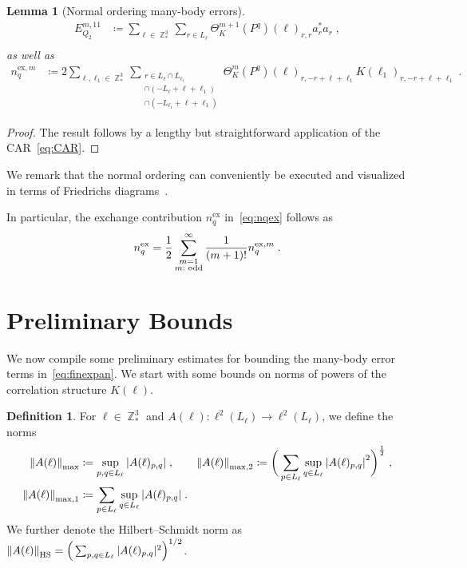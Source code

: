 \documentclass[12pt,a4paper]{article}
\numberwithin{equation}{section}
\newcommand{\1}{\mathbb{I}}
\newcommand{\ex}{\mathrm{ex}}
\newcommand{\HS}{\mathrm{HS}}
\DeclareMathOperator{\Z}{\mathbb{Z}}
\newcommand{\half}{\frac{1}{2}}
\theoremstyle{plain}
\newtheorem{lemma}[theorem]{Lemma}
\theoremstyle{definition}
\newtheorem{definition}[theorem]{Definition}
\theoremstyle{remark}
\theoremstyle{plain}
\theoremstyle{definition}
\theoremstyle{remark}
\begin{document}
\begin{lemma}[Normal ordering many-body errors]
\begin{align}
	E_{Q_2}^{m,11}
	&\coloneq \sum\limits_{\ell \in \Z^3_*} \sum\limits_{r\in L_{\ell}}\Theta^{m+1}_{K}(P^q)(\ell)_{r,r} a^*_{r}a_{r} \;, \label{eq:expandedEQ2}\\
\end{align}
as well as
\begin{align}
	n_q^{\ex,m}
	&\coloneq 2 \sum\limits_{\ell,\ell_1 \in \Z^3_*}\sum\limits_{\substack{r\in L_{\ell} \cap L_{\ell_1}\\ \cap (-L_{\ell}+\ell+\ell_1) \\ \cap (-L_{\ell_1}+\ell+\ell_1 )}} \!\!\!\Theta^m_{K}(P^q)(\ell)_{r,-r+\ell+\ell_1}K(\ell_1)_{r,-r+\ell+\ell_1} \;. \label{eq:nqexm}
\end{align}
\end{lemma}
\begin{proof}
The result follows by a lengthy but straightforward application of the CAR~\eqref{eq:CAR}.
\end{proof}

We remark that the normal ordering can conveniently be executed and visualized in terms of Friedrichs diagrams~\cite{BL23}.

In particular, the exchange contribution $ n_q^{\ex} $ in~\eqref{eq:nqex} follows as
\begin{equation*}
	n_q^{\ex}
	= \half \sum_{\substack{m=1\\m:\textnormal{ odd}}}^\infty \frac{1}{(m+1)!} n_q^{\ex,m} \;.
\end{equation*}






\section{Preliminary Bounds}
\label{sec:prelim_bounds}

We now compile some preliminary estimates for bounding the many-body error terms in~\eqref{eq:finexpan}. We start with some bounds on norms of powers of the correlation structure $ K(\ell) $.

\begin{definition}
For $ \ell \in \Z^3_*$ and $A(\ell) : \ell^2(L_\ell) \to \ell^2(L_\ell)$, we define the norms
\begin{equation}
\begin{aligned}
	\norm{A(\ell)}_{\max}
	&\coloneq \sup\limits_{p,q \in L_\ell}\abs{A(\ell)_{p,q}} \;, \qquad
	\norm{A(\ell)}_{\max,2}
	\coloneq \bigg(\sum\limits_{p \in L_\ell} 
	\sup\limits_{q \in L_\ell}
	\abs{A(\ell)_{p,q}}^2\bigg)^\half \;, \\
	\norm{A(\ell)}_{\mathrm{max,1}}
	&\coloneq \sum\limits_{p \in L_\ell}
	\sup\limits_{q \in L_\ell}
	\abs{A(\ell)_{p,q}} \;.
\end{aligned}
\end{equation}
We further denote the Hilbert--Schmidt norm as $ \norm{A(\ell)}_{\HS} = \Big( \sum_{p,q \in L_\ell} |A(\ell)_{p,q}|^2 \Big)^{1/2} $.
\end{definition}
\end{document}

